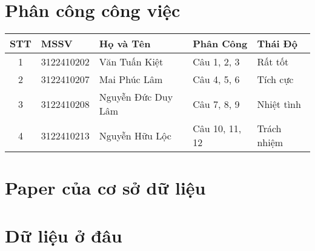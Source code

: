\documentclass{article}
\begin{document}
\begin{titlepage}
\end{titlepage}

\newpage

\section*{Phân công công việc} %

\vspace{0.5cm} %

\begin{tabular}{|c|l|l|l|l|}
    \hline
    \textbf{STT} & \textbf{MSSV} & \textbf{Họ và Tên} & \textbf{Phân Công} & \textbf{Thái Độ} \\ \hline
    1 & 3122410202 & Văn Tuấn Kiệt & Câu 1, 2, 3 & Rất tốt \\ \hline
    2 & 3122410207 & Mai Phúc Lâm & Câu 4, 5, 6 & Tích cực \\ \hline
    3 & 3122410208 & Nguyễn Đức Duy Lâm & Câu 7, 8, 9 & Nhiệt tình \\ \hline
    4 & 3122410213 & Nguyễn Hữu Lộc & Câu 10, 11, 12 & Trách nhiệm \\ \hline
\end{tabular}

\vspace{0.5cm}

\newpage
\tableofcontents
\newpage

\section{Paper của cơ sở dữ liệu}


\section{Dữ liệu ở đâu}

\end{document}
